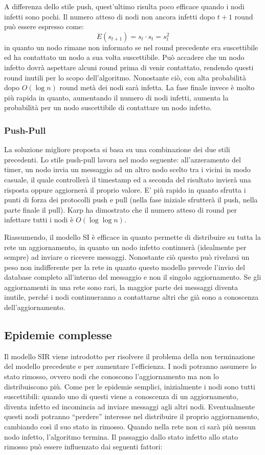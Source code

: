 A differenza dello stile push, quest'ultimo risulta poco efficace quando i nodi infetti sono pochi. Il numero atteso di nodi non ancora infetti dopo $t+1$ round può essere espresso come:
\begin{equation}
    E(s_{t+1}) = s_t \cdot s_t = s_t^2
\end{equation}
in quanto un nodo rimane non informato se nel round precedente era suscettibile ed ha contattato un nodo a sua volta suscettibile. Può accadere che un nodo infetto dovrà aspettare alcuni round prima di venir contattato, rendendo questi round inutili per lo scopo dell'algoritmo. Nonostante ciò, con alta probabilità dopo $O(\log n)$ round metà dei nodi sarà infetta. La fase finale invece è molto più rapida in quanto, aumentando il numero di nodi infetti, aumenta la probabilità per un nodo suscettibile di contattare un nodo infetto.
\subsubsection{Push-Pull}
La soluzione migliore proposta si basa su una combinazione dei due stili precedenti. Lo stile push-pull lavora nel modo seguente: all’azzeramento del timer, un nodo invia un messaggio ad un altro nodo scelto tra i vicini in modo casuale, il quale controllerà il timestamp ed a seconda del risultato invierà una risposta oppure aggiornerà il proprio valore. E’ più rapido in quanto sfrutta i punti di forza dei protocolli push e pull (nella fase iniziale sfrutterà il push, nella parte finale il pull). Karp \cite{karp} ha dimostrato che il numero atteso di round per infettare tutti i nodi è $O(\log\log n)$.

Riassumendo, il modello SI è efficace in quanto permette di distribuire su tutta la rete un aggiornamento, in quanto un nodo infetto continuerà (idealmente per sempre) ad inviare o ricevere messaggi. Nonostante ciò questo può rivelarsi un peso non indifferente per la rete in quanto questo modello prevede l’invio del database completo all’interno del messaggio e non il singolo aggiornamento. Se gli aggiornamenti in una rete sono rari, la maggior parte dei messaggi diventa inutile, perché i nodi continueranno a contattarne altri che già sono a conoscenza  dell’aggiornamento. 
\subsection{Epidemie complesse}

Il modello SIR viene introdotto per risolvere il problema della non terminazione del modello precedente e per aumentare l’efficienza. I nodi potranno assumere lo stato rimosso, ovvero nodi che conoscono l’aggiornamento ma non lo distribuiscono più.
Come per le epidemie semplici, inizialmente i nodi sono tutti suscettibili: quando uno di questi viene a conoscenza di un aggiornamento, diventa infetto ed incomincia ad inviare messaggi agli altri nodi. Eventualmente questi nodi potranno “perdere” interesse nel distribuire il proprio aggiornamento, cambiando così il suo stato in rimosso.
Quando nella rete non ci sarà più nessun nodo infetto, l’algoritmo termina.
Il passaggio dallo stato infetto allo stato rimosso può essere influenzato dai seguenti fattori:

